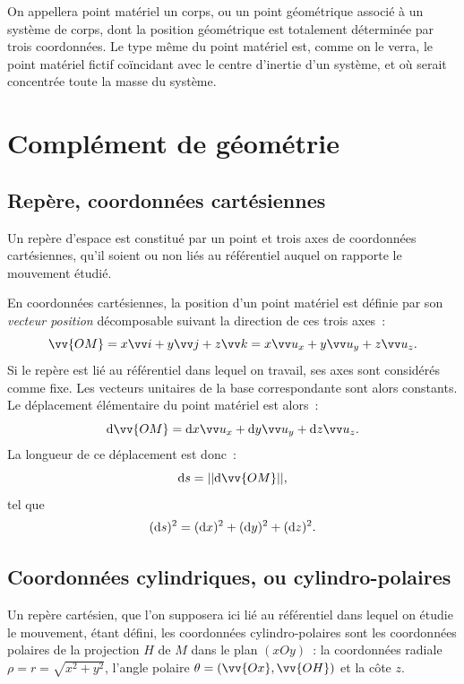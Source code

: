 On appellera point matériel un corps, ou un point géométrique associé à un système de corps, dont la position géométrique est totalement déterminée par trois coordonnées. Le type même du point matériel est, comme on le verra, le point matériel fictif coïncidant avec le centre d'inertie d'un système, et où serait concentrée toute la masse du système.

\section{Complément de géométrie}
\label{chap1-sec:complementdegeometrie}

\subsection{Repère, coordonnées cartésiennes}
\label{chap1-subsec:reperecoord}

Un repère d'espace est constitué par un point et trois axes de coordonnées cartésiennes, qu'il soient ou non liés au référentiel auquel on rapporte le mouvement étudié.

En coordonnées cartésiennes, la position d'un point matériel est définie par son \emph{vecteur position} décomposable suivant la direction de ces trois axes~:
\begin{equation}
  \vv{OM}=x\vi+y\vj+z\vk=x\ux+y\uy+z\uz.
\end{equation}
Si le repère est lié au référentiel dans lequel on travail, ses axes sont considérés comme fixe. Les vecteurs unitaires de la base correspondante sont alors constants. Le déplacement élémentaire du point matériel est alors~:
\begin{equation}
  \D\vv{OM}=\D x\ux+\D y\uy+\D z\uz.
\end{equation}
La longueur de ce déplacement est donc~:
\begin{equation}
  \D s = ||\D\vv{OM}||,
\end{equation}
tel que
\begin{equation}
  (\mathrm{d} s)^2=(\mathrm{d} x)^2+(\mathrm{d} y)^2+(\mathrm{d} z)^2.
\end{equation}

\subsection{Coordonnées cylindriques, ou cylindro-polaires}
\label{chap1-subsec:coordcylindriques}

Un repère cartésien, que l'on supposera ici lié au référentiel dans lequel on étudie le mouvement, étant défini, les coordonnées cylindro-polaires sont les coordonnées polaires de la projection $H$ de $M$ dans le plan $(xOy)$~: la coordonnées radiale $\rho=r=\sqrt{x^2+y^2}$, l'angle polaire $\theta=(\vv{Ox}, \vv{OH})$ et la côte $z$.

